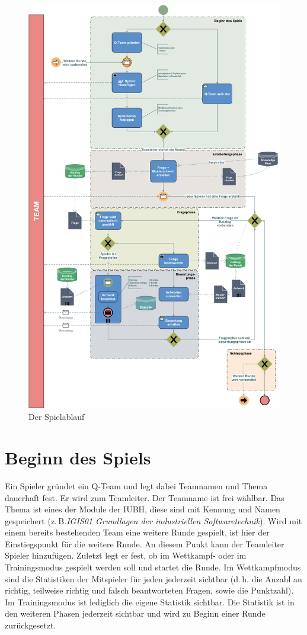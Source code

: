 \documentclass[a4paper,11pt,listof=numbered,glossary=totoc,parskip=half,toc=bib]{scrreprt}
\newcommand{\zB}{\mbox{z.\,B.}\xspace}
\newcommand{\dash}{\mbox{d.\,h.}\xspace}
\begin{document}
	\begin{figure}
		\centering
		\includegraphics[width=\textwidth]{bpmn_IST.png}
		\caption{Der Spielablauf}
		\label{fig:bpmn}
	\end{figure}
	
	\section{Beginn des Spiels}
	Ein Spieler gründet ein Q-Team und legt dabei Teamnamen und Thema dauerhaft fest. Er wird zum Teamleiter. Der Teamname ist frei wählbar. Das Thema ist eines der Module der IUBH, diese sind mit Kennung und Namen gespeichert (\zB \textit{IGIS01 Grundlagen der industriellen Softwaretechnik}). 
	Wird mit einem bereits bestehenden Team eine weitere Runde gespielt, ist hier der Einstiegspunkt für die weitere Runde.
	An diesem Punkt kann der Teamleiter Spieler hinzufügen.
	Zuletzt legt er fest, ob im Wettkampf- oder im Trainingsmodus gespielt werden soll und startet die Runde.
	Im Wettkampfmodus sind die Statistiken der Mitspieler für jeden jederzeit sichtbar (\dash die Anzahl an richtig, teilweise richtig und falsch beantworteten Fragen, sowie die Punktzahl). Im Trainingsmodus ist lediglich die eigene Statistik sichtbar. Die Statistik ist in den weiteren Phasen jederzeit sichtbar und wird zu Beginn einer Runde zurückgesetzt.
	
\end{document}
